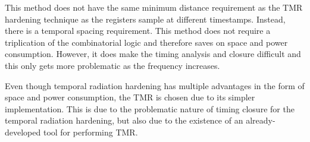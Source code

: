 This method does not have the same minimum distance requirement as the TMR hardening technique as the registers sample at different timestamps. Instead, there is a temporal spacing requirement. 
This method does not require a triplication of the  combinatorial logic and therefore saves on space and power consumption. However, it does make the timing analysis and closure difficult and this only gets more problematic as the frequency increases. 

Even though temporal radiation hardening has multiple advantages in the form of space and power consumption, the TMR is chosen due to its simpler implementation. This is due to the problematic nature of timing closure for the temporal radiation hardening, but also due to the existence of an already-developed tool for performing TMR. 


